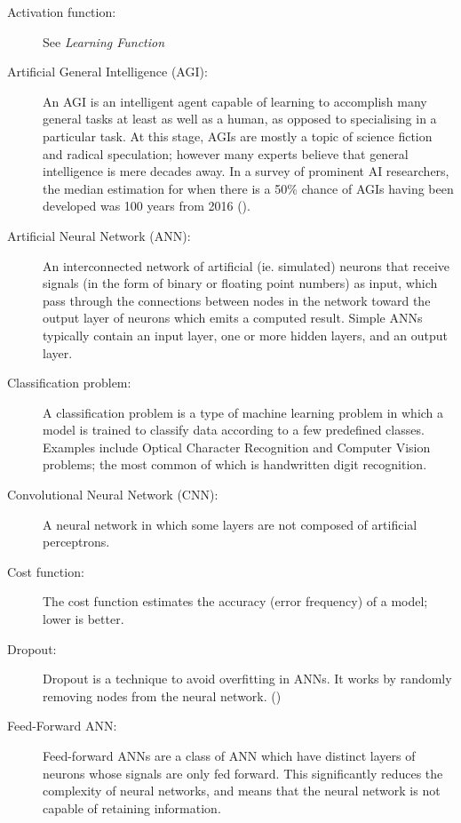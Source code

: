 \documentclass[]{report}
\begin{document}
\begin{description}
\item[Activation function:] See \textit{Learning Function}

\item[Artificial General Intelligence (AGI):] An AGI is an intelligent agent capable of learning to accomplish many general tasks at least as well as a human, as opposed to specialising in a particular task. At this stage, AGIs are mostly a topic of science fiction and radical speculation; however many experts believe that general intelligence is mere decades away. In a survey of prominent AI researchers, the median estimation for when there is a 50\% chance of AGIs having been developed was 100 years from 2016 (\cite{grace2017will}).

\item[Artificial Neural Network (ANN):] An interconnected network of artificial (ie. simulated) neurons that receive signals (in the form of binary or floating point numbers) as input, which pass through the connections between nodes in the network toward the output layer of neurons which emits a computed result. Simple ANNs typically contain an input layer, one or more hidden layers, and an output layer.

\item[Classification problem:] A classification problem is a type of machine learning problem in which a model is trained to classify data according to a few predefined classes. Examples include Optical Character Recognition and Computer Vision problems; the most common of which is handwritten digit recognition.

\item[Convolutional Neural Network (CNN):] A neural network in which some layers are not composed of artificial perceptrons.

\item[Cost function:] The cost function estimates the accuracy (error frequency) of a model; lower is better.

\item[Dropout:] Dropout is a technique to avoid overfitting in ANNs. It works by randomly removing nodes from the neural network. (\cite{dropout14})

\item[Feed-Forward ANN:] Feed-forward ANNs are a class of ANN which have distinct layers of neurons whose signals are only fed forward. This significantly reduces the complexity of neural networks, and means that the neural network is not capable of retaining information.


\end{description}
\end{document}
